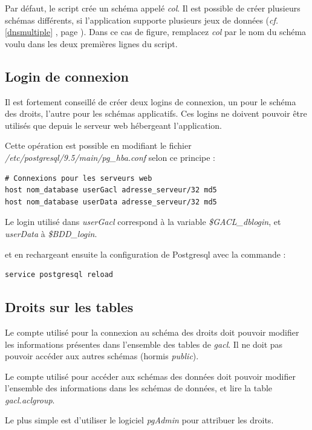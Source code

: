 Par défaut, le script crée un schéma appelé \textit{col}. Il est possible de créer plusieurs schémas différents, si l'application supporte plusieurs jeux de données (\textit{cf.} \ref{dnsmultiple} \textit{}, page \pageref{dnsmultiple}). Dans ce cas de figure, remplacez \textit{col} par le nom du schéma voulu dans les deux premières lignes du script.

\subsection{Login de connexion}

Il est fortement conseillé de créer deux logins de connexion, un pour le schéma des droits, l'autre pour les schémas applicatifs. Ces logins ne doivent pouvoir être utilisés que depuis le serveur web hébergeant l'application.

Cette opération est possible en modifiant le fichier \textit{/etc/postgresql/9.5/main/pg\_hba.conf} selon ce principe :

\begin{lstlisting}
# Connexions pour les serveurs web 
host nom_database userGacl adresse_serveur/32 md5 
host nom_database userData adresse_serveur/32 md5
\end{lstlisting}

Le login utilisé dans \textit{userGacl} correspond à la variable \textit{\$GACL\_dblogin}, et \textit{userData} à \textit{\$BDD\_login}.

et en rechargeant ensuite la configuration de Postgresql avec la commande :
\begin{lstlisting}
service postgresql reload
\end{lstlisting}

\subsection{Droits sur les tables}

Le compte utilisé pour la connexion au schéma des droits doit pouvoir modifier les informations présentes dans l'ensemble des tables de \textit{gacl}. Il ne doit pas pouvoir accéder aux autres schémas (hormis \textit{public}).

Le compte utilisé pour accéder aux schémas des données doit pouvoir modifier l'ensemble des informations dans les schémas de données, et lire la table \textit{gacl.aclgroup}.

Le plus simple est d'utiliser le logiciel \textit{pgAdmin} \cite{pgadmin} pour attribuer les droits.

